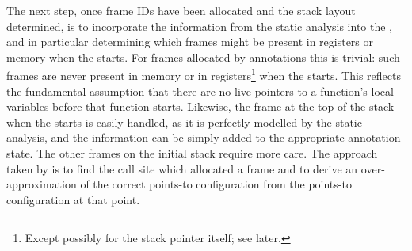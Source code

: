 The next step, once frame IDs have been allocated and the stack layout
determined, is to incorporate the information from the static analysis
into the {\StateMachine}, and in particular determining which frames
might be present in registers or memory when the {\StateMachine}
starts.  For frames allocated by  annotations
this is trivial: such frames are never present in memory or in
registers\footnote{Except possibly for the stack pointer itself; see
  later.} when the {\StateMachine} starts.  This reflects the
fundamental assumption that there are no live pointers to a function's
local variables before that function starts.  Likewise, the frame at
the top of the stack when the {\StateMachine} starts is easily
handled, as it is perfectly modelled by the static analysis, and the
information can be simply added to the appropriate 
annotation state.  The other frames on the initial stack require more
care.  The approach taken by {\implementation} is to find the call
site which allocated a frame and to derive an over-approximation of
the correct points-to configuration from the points-to configuration
at that point.

